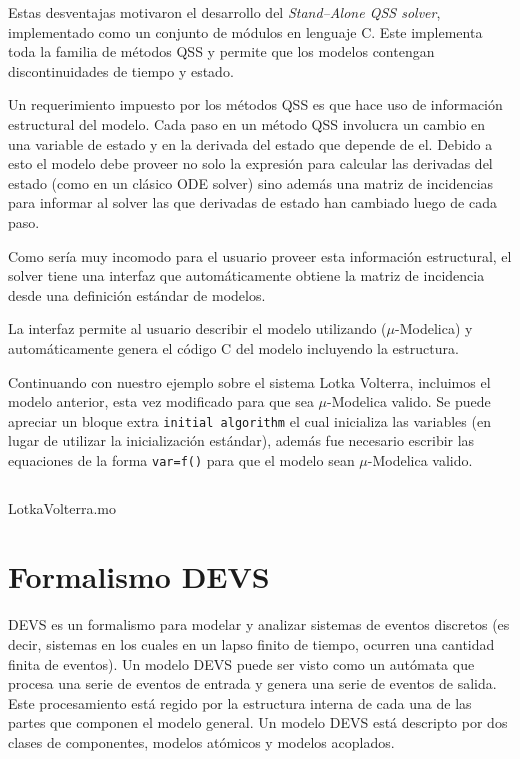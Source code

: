 	Estas desventajas motivaron el desarrollo del \emph{Stand–Alone QSS solver}\cite{Ber12}, implementado como un conjunto de módulos en lenguaje C. Este implementa 
	toda la familia de métodos QSS y permite que los modelos contengan discontinuidades de tiempo y estado.

	Un requerimiento impuesto por los métodos QSS es que hace uso de información estructural del modelo. Cada paso en un método QSS involucra un cambio 
	en una variable de estado y en la derivada del estado que depende de el. Debido a esto el modelo debe proveer no solo la expresión para calcular las 
	derivadas del estado (como en un clásico ODE solver) sino además una matriz de incidencias para informar al solver las que derivadas de estado han cambiado 
	luego de cada paso.

	Como sería muy incomodo para el usuario proveer esta información estructural, el solver tiene una interfaz que automáticamente obtiene la matriz de
	 incidencia desde una definición estándar de modelos.

	La interfaz permite al usuario describir el modelo utilizando ($\mu$-Modelica) y automáticamente genera el código C del modelo incluyendo la estructura.

	Continuando con nuestro ejemplo sobre el sistema Lotka Volterra, incluimos el modelo anterior, esta vez modificado para que sea $\mu$-Modelica valido.
	Se puede apreciar un bloque extra \texttt{initial algorithm} el cual inicializa las variables (en lugar de utilizar la inicialización estándar), además 
	fue necesario escribir las equaciones de la forma \texttt{var=f()} para que el modelo sean $\mu$-Modelica valido.

	\begin{listing}[H]    
		\inputminted[linenos]{modelica}{src/lotka_volterra_qss.mo}
		\caption{LotkaVolterra.mo}\label{lst:LotkaVolterra_qss.mo}
	\end{listing} 

\section{Formalismo DEVS}
	DEVS\cite{Zeigler} es un formalismo para modelar y analizar sistemas de eventos discretos (es decir, sistemas en los cuales en un lapso finito de tiempo, 
	ocurren una cantidad finita de eventos).
	Un modelo DEVS puede ser visto como un autómata que procesa una serie de eventos de entrada y genera una serie de eventos de salida. 
	Este procesamiento está regido por la estructura interna de cada una de las partes que componen el modelo general.
	Un modelo DEVS está descripto por dos clases de componentes, modelos atómicos y modelos acoplados.

